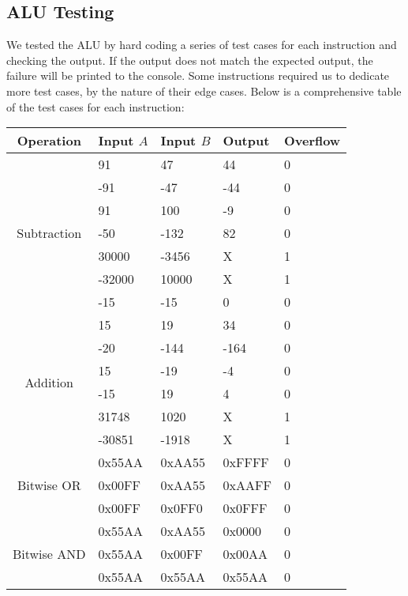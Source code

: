 \documentclass[11pt]{article}
\begin{document}
\subsection{ALU Testing}
We tested the ALU by hard coding a series of test cases for each instruction and checking the output. If the output does not match the expected output, the failure will be printed to the console. Some instructions required us to dedicate more test cases, by the nature of their edge cases. Below is a comprehensive table of the test cases for each instruction: \\

{\centering
\begin{tabular}{|c|l|l|l|l|}
	\hline
	\textbf{Operation} & \textbf{Input $A$} & \textbf{Input $B$} & \textbf{Output} & \textbf{Overflow} \\
	\hline
	
	\multirow{7}{*}{Subtraction} & 91 & 47 & 44 & 0 \\
	& -91 & -47 & -44 & 0 \\
	& 91 & 100 & -9 & 0 \\
	& -50 & -132 & 82 & 0 \\
	& 30000 & -3456 & X & 1 \\
	& -32000 & 10000 & X & 1 \\
	& -15 & -15 & 0 & 0 \\
	\hline
	
	\multirow{6}{*}{Addition} & 15 & 19 & 34 & 0 \\
	& -20 & -144 & -164 & 0 \\
	& 15 & -19 & -4 & 0 \\
	& -15 & 19 & 4 & 0 \\
	& 31748 & 1020 & X & 1 \\
	& -30851 & -1918 & X & 1 \\
	\hline
	
	\multirow{3}{*}{Bitwise OR} & 0x55AA & 0xAA55 & 0xFFFF & 0 \\
	& 0x00FF & 0xAA55 & 0xAAFF & 0 \\
	& 0x00FF & 0x0FF0 & 0x0FFF & 0 \\
	\hline
	
	\multirow{3}{*}{Bitwise AND} & 0x55AA & 0xAA55 & 0x0000 & 0 \\
	& 0x55AA & 0x00FF & 0x00AA & 0 \\
	& 0x55AA & 0x55AA & 0x55AA & 0 \\
	\hline
\end{tabular} \par
}
\end{document}
